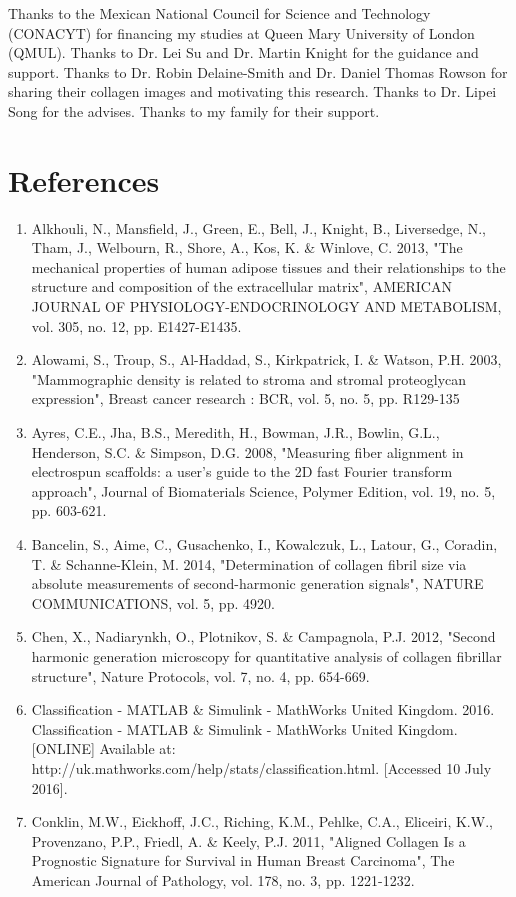 \documentclass[12pt,a4paper]{article}
\begin{document}
Thanks to the Mexican National Council for Science and Technology (CONACYT) for financing my studies at Queen Mary University of London (QMUL). Thanks to Dr. Lei Su and Dr. Martin Knight for the guidance and support. Thanks to Dr. Robin Delaine-Smith and Dr. Daniel Thomas Rowson for sharing their collagen images and motivating this research. Thanks to Dr. Lipei Song for the advises. Thanks to my family for their support.      

\section{References}
\begin{enumerate}
\item Alkhouli, N., Mansfield, J., Green, E., Bell, J., Knight, B., Liversedge, N., Tham, J., Welbourn, R., Shore, A., Kos, K. \& Winlove, C. 2013, "The mechanical properties of human adipose tissues and their relationships to the structure and composition of the extracellular matrix", AMERICAN JOURNAL OF PHYSIOLOGY-ENDOCRINOLOGY AND METABOLISM, vol. 305, no. 12, pp. E1427-E1435.
\item Alowami, S., Troup, S., Al-Haddad, S., Kirkpatrick, I. \& Watson, P.H. 2003, "Mammographic density is related to stroma and stromal proteoglycan expression", Breast cancer research : BCR, vol. 5, no. 5, pp. R129-135
\item Ayres, C.E., Jha, B.S., Meredith, H., Bowman, J.R., Bowlin, G.L., Henderson, S.C. \& Simpson, D.G. 2008, "Measuring fiber alignment in electrospun scaffolds: a user's guide to the 2D fast Fourier transform approach", Journal of Biomaterials Science, Polymer Edition, vol. 19, no. 5, pp. 603-621.
\item Bancelin, S., Aime, C., Gusachenko, I., Kowalczuk, L., Latour, G., Coradin, T. \& Schanne-Klein, M. 2014, "Determination of collagen fibril size via absolute measurements of second-harmonic generation signals", NATURE COMMUNICATIONS, vol. 5, pp. 4920.
\item Chen, X., Nadiarynkh, O., Plotnikov, S. \& Campagnola, P.J. 2012, "Second harmonic generation microscopy for quantitative analysis of collagen fibrillar structure", Nature Protocols, vol. 7, no. 4, pp. 654-669.
\item Classification - MATLAB \& Simulink - MathWorks United Kingdom. 2016. Classification - MATLAB \& Simulink - MathWorks United Kingdom. [ONLINE] Available at: http://uk.mathworks.com/help/stats/classification.html. [Accessed 10 July 2016].
\item Conklin, M.W., Eickhoff, J.C., Riching, K.M., Pehlke, C.A., Eliceiri, K.W., Provenzano, P.P., Friedl, A. \& Keely, P.J. 2011, "Aligned Collagen Is a Prognostic Signature for Survival in Human Breast Carcinoma", The American Journal of Pathology, vol. 178, no. 3, pp. 1221-1232.

\end{enumerate}
\end{document}
